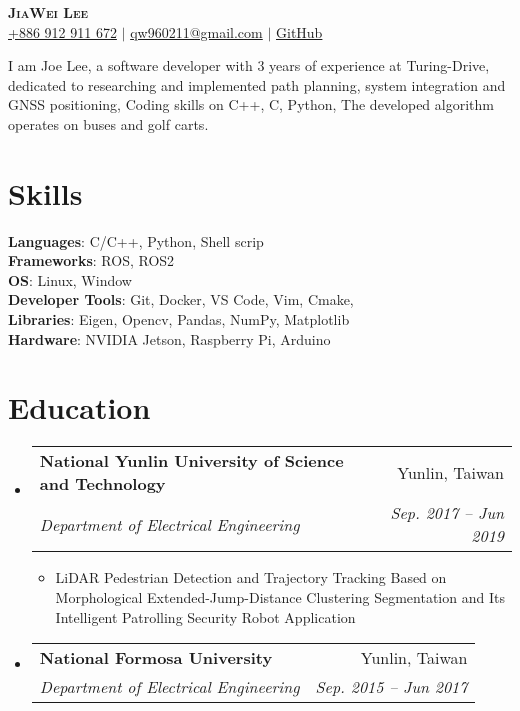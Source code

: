 \documentclass[letterpaper,11pt]{article}
\makeatletter
\newcommand{\resumeItem}[1]{
  \item\small{
    {#1 \vspace{-2pt}}
  }
}
\newcommand{\resumeSubheading}[4]{
  \vspace{-2pt}\item
    \begin{tabular*}{0.97\textwidth}[t]{l@{\extracolsep{\fill}}r}
      \textbf{#1} & #2 \\
      \textit{\small#3} & \textit{\small #4} \\
    \end{tabular*}\vspace{-7pt}
}
\newcommand{\resumeSubHeadingListStart}{\begin{itemize}[leftmargin=0.15in, label={}]}
\newcommand{\resumeSubHeadingListEnd}{\end{itemize}}
\newcommand{\resumeItemListStart}{\begin{itemize}}
\newcommand{\resumeItemListEnd}{\end{itemize}\vspace{-5pt}}
\makeatother
\begin{document}
\begin{center}
    \textbf{\Huge \scshape JiaWei Lee} \\ \vspace{3pt}
    \faMobile \hspace{.5pt} \href{tel:0912911672}{\color{blue}+886 912 911 672} $|$
    \faAt \hspace{.5pt} \href{mailto:qw960211@gmail.com}{\color{blue}qw960211@gmail.com} $|$
    \faGithub \hspace{.5pt} \href{https://github.com/EC404}{\color{blue}GitHub}
\end{center}

{I am Joe Lee, a software developer with 3 years of experience at Turing-Drive, dedicated to researching and implemented path planning, system integration and GNSS positioning, Coding skills on C++, C, Python, The developed algorithm operates on buses and golf carts.} \\

\section{\textbf{Skills}}
 \begin{itemize}[leftmargin=0.15in, label={}]
    \small{\item{
     \textbf{Languages}{: C/C++, Python, Shell scrip} \\
     \textbf{Frameworks}{: ROS, ROS2} \\
     \textbf{OS}{: Linux, Window} \\
     \textbf{Developer Tools}{: Git, Docker, VS Code, Vim, Cmake, } \\
     \textbf{Libraries}{: Eigen, Opencv, Pandas, NumPy, Matplotlib} \\
     \textbf{Hardware}{: NVIDIA Jetson, Raspberry Pi, Arduino}
    }}
 \end{itemize}

\section{\textbf{Education}}
  \vspace{3pt}
  \resumeSubHeadingListStart
    \resumeSubheading
      {National Yunlin University of  Science and Technology}{Yunlin, Taiwan}
      {Department of Electrical Engineering}{Sep. 2017 -- Jun 2019}
      \resumeItemListStart
        \resumeItem{LiDAR Pedestrian Detection and Trajectory Tracking Based on Morphological Extended-Jump-Distance  Clustering Segmentation and Its Intelligent Patrolling  Security Robot Application}
      \resumeItemListEnd
    \resumeSubheading
      {National Formosa University}{Yunlin, Taiwan}
      {Department of Electrical Engineering}{Sep. 2015 -- Jun 2017}
  \resumeSubHeadingListEnd
\end{document}
